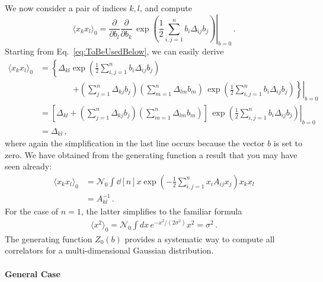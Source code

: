 \documentclass[notes.tex]{subfiles}
\begin{document}
We now consider a pair of indices $k,l$, and compute
\begin{equation}
  \label{eq:GaussTwoPt}
  \langle x_k x_l \rangle_0 = 
  \frac{\partial}{\partial b_l} \frac{\partial}{\partial b_k} \,
  \left. \exp\left(
    \frac12 \sum_{i,j=1}^n b_i \Delta_{ij} b_j
  \right) \right|_{b=0} \, .
\end{equation}
Starting from Eq.~\ref{eq:ToBeUsedBelow}, we can easily derive
\begin{align}
  \langle x_k x_l \rangle_0 &= 
 \left\{
   \Delta_{kl} \exp\left(
     \frac12 \sum_{i,j=1}^n b_i \Delta_{ij} b_j
   \right)
 \right. 
\\
  & \quad\quad\quad\quad \left. \left. + \left(
     \sum_{j=1}^n \Delta_{kj} b_j
    \right)
    \left(
     \sum_{m=1}^n \Delta_{lm} b_m
    \right)\, 
    \exp\left(
    \frac12 \sum_{i,j=1}^n b_i \Delta_{ij} b_j
  \right)
    \right\} \right|_{b=0} \\
  &= \left.\left[ \Delta_{kl} + \left(
     \sum_{j=1}^n \Delta_{kj} b_j
    \right)
    \left(
     \sum_{m=1}^n \Delta_{lm} b_m
    \right)
    \right]\, 
\exp\left(
    \frac12 \sum_{i,j=1}^n b_i \Delta_{ij} b_j
  \right)
   \right|_{b=0} \\
  &= \Delta_{kl}\, ,
\end{align}
where again the simplification in the last line occurs because the vector $b$ is set to zero. We have obtained from the generating function a result that you may have seen already: 
\begin{align}
  \langle x_k x_l \rangle_0 &= 
  \mathcal{N}_0 \int \dd[n]{x} \exp\left(
    -\frac12 \sum_{i,j=1}^n x_i A_{ij} x_j
    \right) x_k x_l \\
  &= A^{-1}_{kl}\, .
\end{align}
For the case of $n=1$, the latter simplifies to the familiar formula
\begin{align}
  \langle x^2 \rangle_0 = 
  \mathcal{N}_0 \int dx\, e^{-x^2/(2\sigma^2)} x^2 = \sigma^2\, .
\end{align}
The generating function $Z_0(b)$ provides a systematic way to compute all correlators for a multi-dimensional Gaussian distribution. 

\paragraph{General Case}
\end{document}
